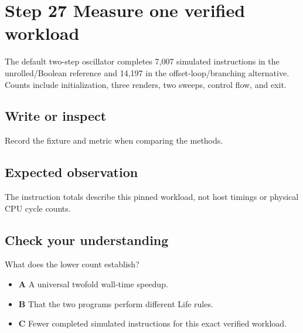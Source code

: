 \section{Step 27 Measure one verified
  workload}\label{008-life-generations-s27-step-27-measure-one-verified-workload}

The default two-step oscillator completes 7,007 simulated instructions
in the unrolled/Boolean reference and 14,197 in the
offset-loop/branching alternative. Counts include initialization, three
renders, two sweeps, control flow, and exit.

\subsection{Write or
  inspect}\label{008-life-generations-s27-write-or-inspect}

Record the fixture and metric when comparing the methods.

\subsection{Expected
  observation}\label{008-life-generations-s27-expected-observation}

The instruction totals describe this pinned workload, not host timings
or physical CPU cycle counts.

\subsection{Check your
  understanding}\label{008-life-generations-s27-check-your-understanding}

What does the lower count establish?

\begin{itemize}
  \tightlist
  \item
        \textbf{A} A universal twofold wall-time speedup.
  \item
        \textbf{B} That the two programs perform different Life rules.
  \item
        \textbf{C} Fewer completed simulated instructions for this exact
        verified workload.
\end{itemize}
